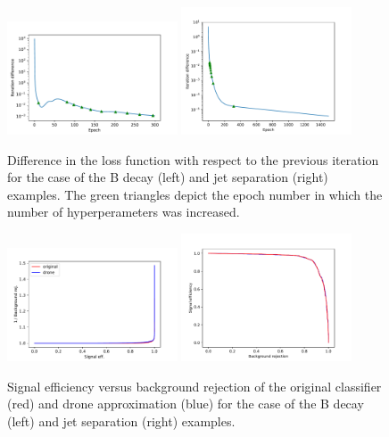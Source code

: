 \documentclass[final,5p,times,twocolumn]{elsarticle}
\begin{document}
\begin{figure}[t]
\centering
\includegraphics[width=0.45\textwidth]{diff_history.pdf}
\includegraphics[width=0.45\textwidth]{diff_history_gpd.pdf}
\caption{\small
Difference in the loss function with respect to the previous iteration
  for the case of the B
  decay (left) and jet separation (right) examples.
  The green triangles
depict the epoch number in which the number of hyperperameters was increased.
}
\label{fig:iterdiff}
\end{figure}
\begin{figure}[t]
\centering
\includegraphics[width=0.45\textwidth]{roc.pdf}
\includegraphics[width=0.45\textwidth]{roc_gpd.pdf}
\caption{\small
  Signal efficiency versus background rejection of the original classifier (red) and drone
  approximation (blue)
  for the case of the B
  decay (left) and jet separation (right) examples.
}
\label{fig:roc}
\end{figure}
\end{document}

